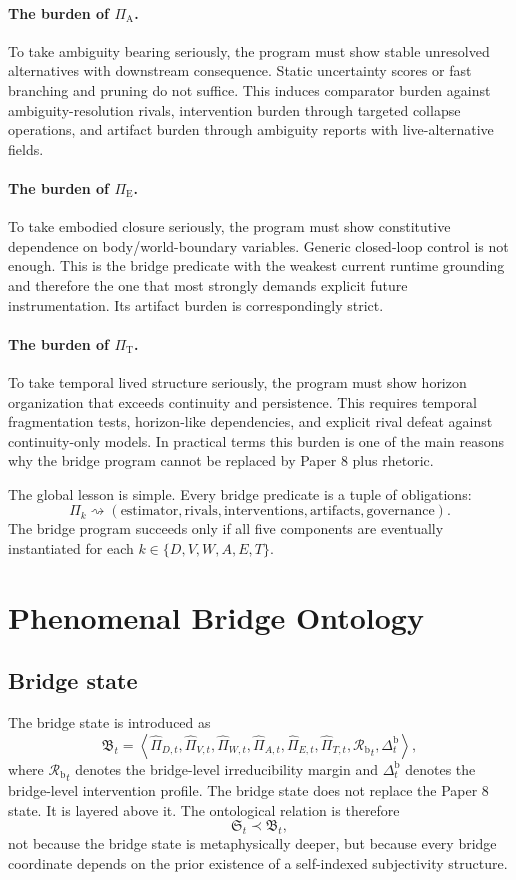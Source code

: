 \documentclass[11pt,a4paper]{article}
\theoremstyle{definition}
\newcommand{\Substate}{\mathfrak{S}}
\newcommand{\BridgeState}{\mathfrak{B}}
\newcommand{\IntervProf}{\Delta}
\newcommand{\PiA}{\Pi_{\mathrm{A}}}
\newcommand{\PiE}{\Pi_{\mathrm{E}}}
\newcommand{\PiT}{\Pi_{\mathrm{T}}}
\newcommand{\BridgeMargin}{\mathcal{R}_{\mathrm{b}}}
\begin{document}
\paragraph{The burden of $\PiA$.}
To take ambiguity bearing seriously, the program must show stable unresolved alternatives with downstream consequence. Static uncertainty scores or fast branching and pruning do not suffice. This induces comparator burden against ambiguity-resolution rivals, intervention burden through targeted collapse operations, and artifact burden through ambiguity reports with live-alternative fields.

\paragraph{The burden of $\PiE$.}
To take embodied closure seriously, the program must show constitutive dependence on body/world-boundary variables. Generic closed-loop control is not enough. This is the bridge predicate with the weakest current runtime grounding and therefore the one that most strongly demands explicit future instrumentation. Its artifact burden is correspondingly strict.

\paragraph{The burden of $\PiT$.}
To take temporal lived structure seriously, the program must show horizon organization that exceeds continuity and persistence. This requires temporal fragmentation tests, horizon-like dependencies, and explicit rival defeat against continuity-only models. In practical terms this burden is one of the main reasons why the bridge program cannot be replaced by Paper 8 plus rhetoric.

The global lesson is simple. Every bridge predicate is a tuple of obligations:
\[
\Pi_k \rightsquigarrow
(\text{estimator},\text{rivals},\text{interventions},\text{artifacts},\text{governance}).
\]
The bridge program succeeds only if all five components are eventually instantiated for each $k\in\{D,V,W,A,E,T\}$.

\section{Phenomenal Bridge Ontology}
\subsection{Bridge state}
The bridge state is introduced as
\[
\BridgeState_t=
\left\langle
\widehat{\Pi}_{D,t},
\widehat{\Pi}_{V,t},
\widehat{\Pi}_{W,t},
\widehat{\Pi}_{A,t},
\widehat{\Pi}_{E,t},
\widehat{\Pi}_{T,t},
{\BridgeMargin}_t,
\IntervProf^{\mathrm{b}}_t
\right\rangle,
\]
where ${\BridgeMargin}_t$ denotes the bridge-level irreducibility margin and $\IntervProf^{\mathrm{b}}_t$ denotes the bridge-level intervention profile. The bridge state does not replace the Paper 8 state. It is layered above it. The ontological relation is therefore
\[
\Substate_t \prec \BridgeState_t,
\]
not because the bridge state is metaphysically deeper, but because every bridge coordinate depends on the prior existence of a self-indexed subjectivity structure.
\end{document}
